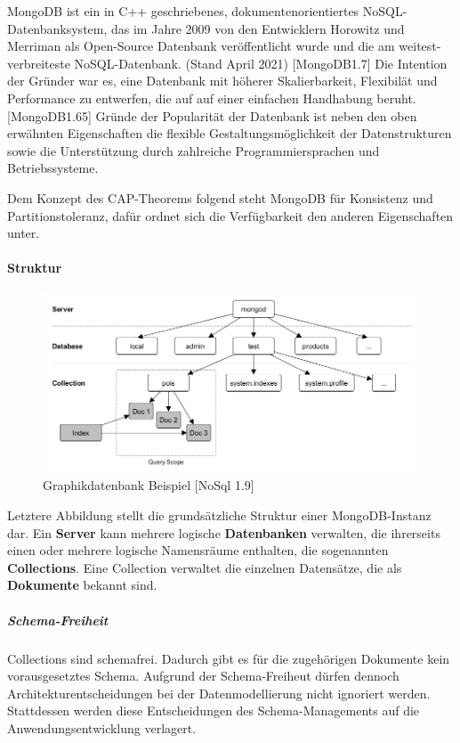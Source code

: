 MongoDB ist ein in C++ geschriebenes, dokumentenorientiertes NoSQL-Datenbanksystem, das im Jahre 2009 von den Entwicklern Horowitz und Merriman als Open-Source Datenbank veröffentlicht wurde und die am weitest-verbreiteste NoSQL-Datenbank. (Stand April 2021) [MongoDB1.7] Die Intention der Gründer war es, eine Datenbank mit höherer Skalierbarkeit, Flexibilät und Performance zu entwerfen, die auf auf einer einfachen Handhabung beruht. [MongoDB1.65]
Gründe der Popularität der Datenbank ist neben den oben erwähnten Eigenschaften die flexible Gestaltungsmöglichkeit der Datenstrukturen sowie die Unterstützung durch zahlreiche Programmiersprachen und Betriebssysteme.

Dem Konzept des CAP-Theorems folgend steht MongoDB für Konsistenz und Partitionstoleranz, dafür ordnet sich die Verfügbarkeit den anderen Eigenschaften unter.
\newline

\paragraph{Struktur}

\begin{figure}[htb]
\centering
\includegraphics[width=14cm]{images/MongoDB_Architektur.png}
\caption{Graphikdatenbank Beispiel [NoSql 1.9]}
\end{figure}

Letztere Abbildung stellt die grundsätzliche Struktur einer MongoDB-Instanz dar.
Ein \textbf{Server} kann mehrere logische \textbf{Datenbanken} verwalten, die ihrerseits einen oder mehrere logische Namensräume enthalten, die sogenannten \textbf{Collections}. Eine Collection verwaltet die einzelnen Datensätze, die als \textbf{Dokumente} bekannt sind. 
\newline

\subparagraph{Schema-Freiheit}
Collections sind schemafrei. Dadurch gibt es für die zugehörigen Dokumente kein vorausgesetztes Schema. Aufgrund der Schema-Freiheut dürfen dennoch Architekturentscheidungen bei der Datenmodellierung nicht ignoriert werden. Stattdessen werden diese Entscheidungen des Schema-Managements auf die Anwendungsentwicklung verlagert.
\newline


